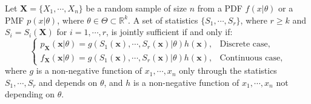 \documentclass{huhtakm-template-book-v2}
\begin{document}
    \begin{thm}
        Let $\mathbf{X} = \{X_{1}, \cdots, X_{n}\}$ be a random sample of size $n$ from a PDF $f(x | \theta)$ or a PMF $p(x | \theta)$, where $\theta \in \Theta \subset \mathbb{R}^{k}$. A set of statistics $\{S_{1}, \cdots, S_{r}\}$, where $r \geq k$ and $S_{i} = S_{i}(\mathbf{X})$ for $i = 1, \cdots, r$, is jointly sufficient if and only if:
        \begin{equation*}
            \begin{cases}
                p_{\mathbf{X}}(\mathbf{x} | \theta) = g(S_{1}(\mathbf{x}), \cdots, S_{r}(\mathbf{x}) | \theta)h(\mathbf{x}), &\text{Discrete case},\\
                f_{\mathbf{X}}(\mathbf{x} | \theta) = g(S_{1}(\mathbf{x}), \cdots, S_{r}(\mathbf{x}) | \theta)h(\mathbf{x}), &\text{Continuous case},
            \end{cases}
        \end{equation*}
        where $g$ is a non-negative function of $x_{1}, \cdots, x_{n}$ only through the statistics $S_{1}, \cdots, S_{r}$ and depends on $\theta$, and $h$ is a non-negative function of $x_{1}, \cdots, x_{n}$ not depending on $\theta$.
    \end{thm}
\end{document}
